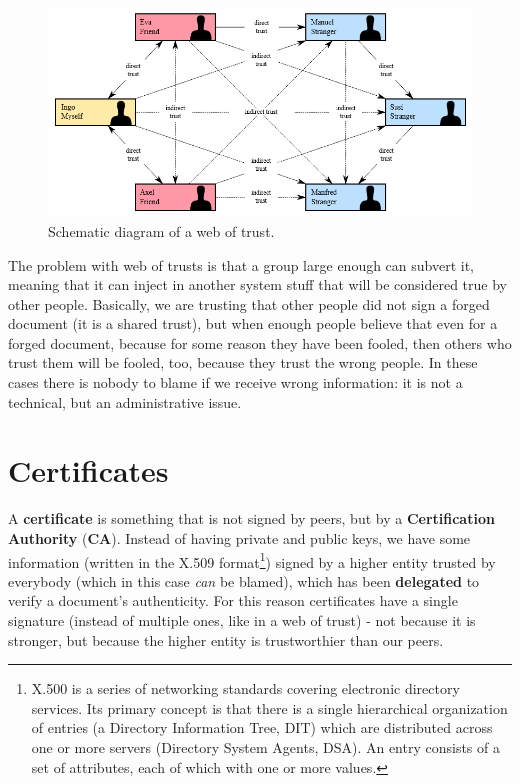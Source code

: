 \begin{figure}[h]
    \centering
    \includegraphics[scale=0.8]{img/wot.png}
    \decoRule
    \caption{Schematic diagram of a web of trust.}
    \label{fig:wot}
\end{figure}

The problem with web of trusts is that a group large enough can subvert it, meaning that it can inject in another system stuff that will be considered true by other people. Basically, we are trusting that other people did not sign a forged document (it is a shared trust), but when enough people believe that even for a forged document, because for some reason they have been fooled, then others who trust them will be fooled, too, because they trust the wrong people. In these cases there is nobody to blame if we receive wrong information: it is not a technical, but an administrative issue.


\section{Certificates}
A \textbf{certificate} is something that is not signed by peers, but by a \textbf{Certification Authority} (\textbf{CA}). Instead of having private and public keys, we have some information (written in the X.509 format\footnote{\label{foot:x500}X.500 is a series of networking standards covering electronic directory services. Its primary concept is that there is a single hierarchical organization of entries (a Directory Information Tree, DIT) which are distributed across one or more servers (Directory System Agents, DSA). An entry consists of a set of attributes, each of which with one or more values.}) signed by a higher entity trusted by everybody (which in this case \textit{can} be blamed), which has been \textbf{delegated} to verify a document's authenticity. For this reason certificates have a single signature (instead of multiple ones, like in a web of trust) - not because it is stronger, but because the higher entity is trustworthier than our peers.

